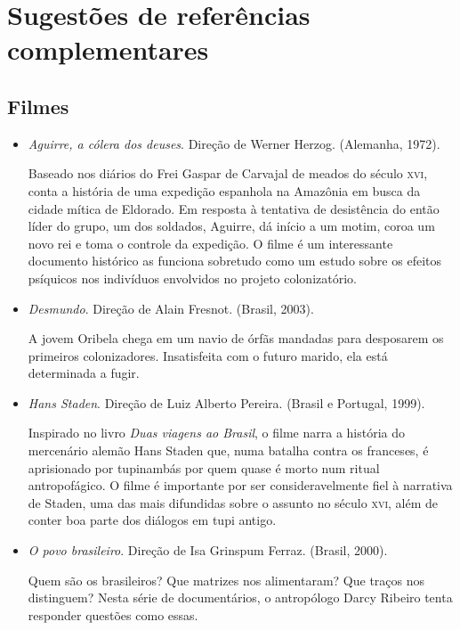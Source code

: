 \documentclass[12pt]{extarticle}
\begin{document}
\section{Sugestões de referências complementares}\label{sugestoes}

\subsection{Filmes} 
\begin{itemize}

	\item \emph{Aguirre, a cólera dos deuses}. Direção de Werner Herzog. 
	(Alemanha, 1972).

	Baseado nos diários do Frei Gaspar de Carvajal de meados do século 
	\textsc{xvi}, conta a história de uma expedição espanhola na Amazônia 
	em busca da cidade mítica de Eldorado. Em resposta à tentativa de 
	desistência do então líder do grupo, um dos	soldados, Aguirre, dá 
	início a um motim, coroa um novo rei e toma o controle da expedição. 
	O filme é um interessante documento histórico as funciona sobretudo 
	como um estudo sobre os efeitos psíquicos nos indivíduos envolvidos 
	no projeto colonizatório.

	\item \emph{Desmundo}. Direção de Alain Fresnot. (Brasil, 2003).

	A jovem Oribela chega em um navio de órfãs mandadas para desposarem os
	primeiros colonizadores. Insatisfeita com o futuro marido, ela está
	determinada a fugir.

	\item \emph{Hans Staden}. Direção de Luiz Alberto Pereira. (Brasil e 
	Portugal, 1999).

	Inspirado no livro \emph{Duas viagens ao Brasil}, o filme narra a história
	do mercenário alemão Hans Staden que, numa batalha contra os franceses,
	é aprisionado por tupinambás por quem quase é morto num ritual antropofágico.
	O filme é importante por ser consideravelmente fiel à narrativa de
	Staden, uma das mais difundidas sobre o assunto no século \textsc{xvi},
	além de conter boa parte dos diálogos em tupi antigo.

	\item \emph{O povo brasileiro}. Direção de Isa Grinspum Ferraz. (Brasil, 2000).

	Quem são os brasileiros? Que matrizes nos alimentaram? Que traços nos
	distinguem? Nesta série de documentários, o antropólogo Darcy Ribeiro
	tenta responder questões como essas.

	\end{itemize}
\end{document}
